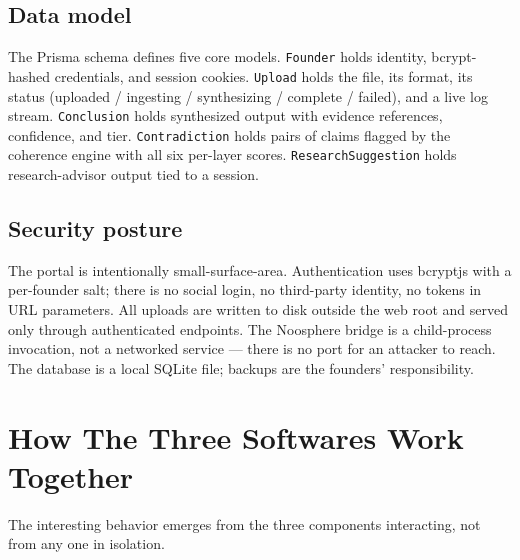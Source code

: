 \documentclass[11pt]{article}
\begin{document}
\subsection{Data model}

The Prisma schema defines five core models. \texttt{Founder} holds identity, bcrypt-hashed credentials, and session cookies. \texttt{Upload} holds the file, its format, its status (uploaded / ingesting / synthesizing / complete / failed), and a live log stream. \texttt{Conclusion} holds synthesized output with evidence references, confidence, and tier. \texttt{Contradiction} holds pairs of claims flagged by the coherence engine with all six per-layer scores. \texttt{ResearchSuggestion} holds research-advisor output tied to a session.

\subsection{Security posture}

The portal is intentionally small-surface-area. Authentication uses bcryptjs with a per-founder salt; there is no social login, no third-party identity, no tokens in URL parameters. All uploads are written to disk outside the web root and served only through authenticated endpoints. The Noosphere bridge is a child-process invocation, not a networked service --- there is no port for an attacker to reach. The database is a local SQLite file; backups are the founders' responsibility.

\clearpage

\section{How The Three Softwares Work Together}

The interesting behavior emerges from the three components interacting, not from any one in isolation.
\end{document}

